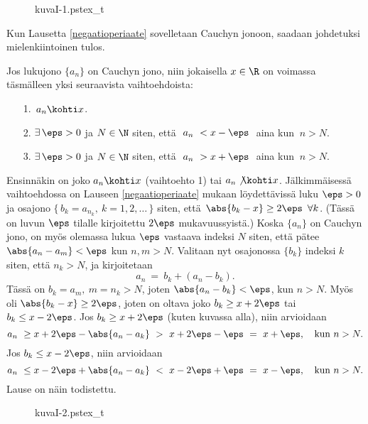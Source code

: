 \begin{figure}[H]
{kuvaI-1.pstex_t}
\end{figure}

Kun Lausetta \ref{negaatioperiaate} sovelletaan Cauchyn jonoon, saadaan johdetuksi 
mielenkiintoinen tulos.
\begin{*Lause} \label{Cauchyn jonon vaihtoehdot} Jos lukujono $\{a_n\}$ on Cauchyn jono, niin 
jokaisella $x\in\R$ on voimassa täsmälleen yksi seuraavista vaihtoehdoista:
\begin{itemize}
\item[1.] $\,a_n \kohti x$.
\item[2.] $\exists\,\eps>0$ ja $N \in \N$ siten, että $\ a_n\ < x - \eps\ $ aina kun $\ n>N$.
\item[3.] $\exists\,\eps>0$ ja $N \in \N$ siten, että $\ a_n\ > x + \eps\ $ aina kun $\ n>N$.
\end{itemize} 
\end{*Lause}
\tod Ensinnäkin on joko $a_n \kohti x$ (vaihtoehto 1) tai $a_n \not\kohti x$.
Jälkimmäisessä vaihtoehdossa on Lauseen \ref{negaatioperiaate} mukaan löydettävissä luku 
$\eps>0$ ja osajono $\{\,b_k = a_{n_k},\ k = 1, 2, \ldots\,\}$ siten, että 
$\,\abs{b_k - x} \ge 2 \eps\ \,\forall k$. (Tässä on luvun $\eps$ tilalle kirjoitettu $2 \eps$
mukavuussyistä.) Koska $\{a_n\}$ on Cauchyn jono, on myös olemassa lukua $\eps$ vastaava
indeksi $N$ siten, että pätee $\abs{a_n - a_m} < \eps$ kun $n,m > N$. Valitaan nyt osajonossa
$\{b_k\}$ indeksi $k$ siten, että $n_k > N$, ja kirjoitetaan
\[
a_n\ =\ b_k + (a_n - b_k).
\]
Tässä on $b_k = a_m,\ m = n_k > N$, joten $\abs{a_n - b_k} < \eps$, kun $n > N$. Myös oli
$\abs{b_k - x} \ge 2 \eps$, joten on oltava joko $b_k \ge x + 2 \eps$ tai $b_k \le x - 2 \eps$.
Jos  $b_k \ge x + 2 \eps$ (kuten kuvassa alla), niin arvioidaan
\[
a_n\ \ge x + 2 \eps - \abs{a_n - a_k}\ >\ x + 2 \eps - \eps\ =\ x + \eps, \quad \text{kun}\ n>N.
\]
Jos  $b_k \le x - 2 \eps$, niin arvioidaan
\[
a_n\ \le x - 2 \eps + \abs{a_n - a_k}\ <\ x - 2 \eps + \eps\ =\ x -\eps, \quad \text{kun}\ n>N.
\]
Lause on näin todistettu. \loppu
\vspace{5mm}
\begin{figure}[H]
{kuvaI-2.pstex_t}
\end{figure}

